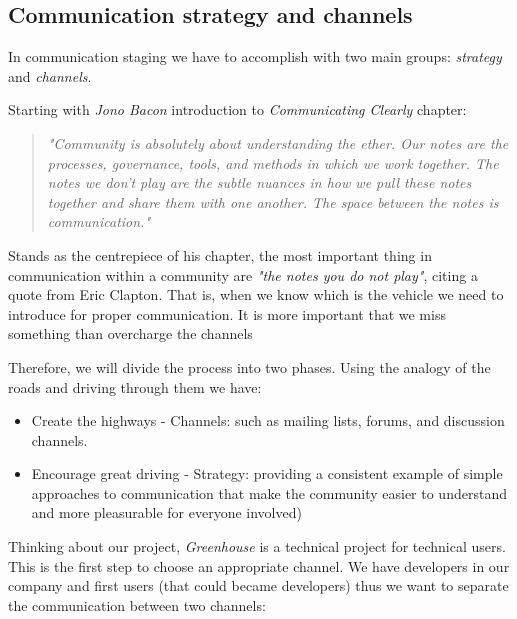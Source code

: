 \documentclass[11pt]{scrartcl}
\begin{document}

\subsection{Communication strategy and channels}
\label{sub:communication-strategy}

\par In communication staging we have to accomplish with two main groups: \emph{strategy} and \emph{channels}.

\par Starting with \emph{Jono Bacon}\cite{art-of-community} introduction to \emph{Communicating Clearly} chapter:
\begin{quotation}
    \emph{"Community is absolutely about understanding the ether. Our notes are the processes, governance, tools, and methods in which we work together. The notes we don’t play are the subtle nuances in how we pull these notes together and share them with one another. The space between the notes is communication."}
\end{quotation}

\par Stands as the centrepiece of his chapter, the most important thing in communication within a community are \emph{"the notes you do not play"}, citing a quote from Eric Clapton. That is, when we know which is the vehicle we need to introduce for proper communication. It is more important that we miss something than overcharge the channels

\par Therefore, we will divide the process into two phases. Using the analogy of the roads and driving through them we have:
\begin{itemize}
	\item Create the highways - Channels: such as mailing lists, forums, and discussion channels.
    \item Encourage great driving - Strategy: providing a consistent example of simple approaches to communication that make the community easier to understand and more pleasurable for everyone involved)
\end{itemize}

\par Thinking about our project, \emph{Greenhouse} is a technical project for technical users. This is the first step to choose an appropriate channel. We have developers in our company and first users (that could became developers) thus we want to separate the communication between two channels:
\end{document}
